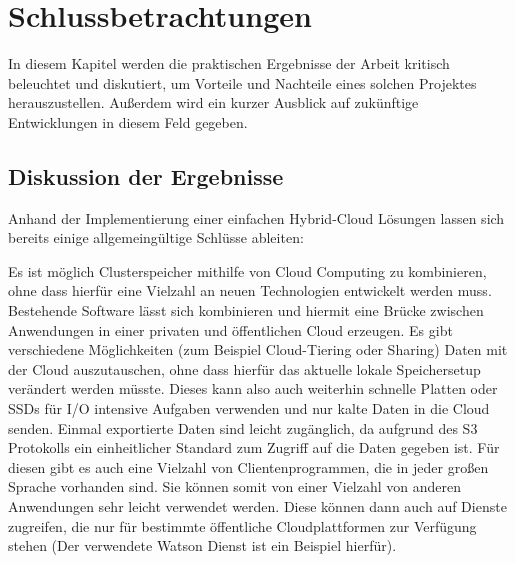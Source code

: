 \chapter{Schlussbetrachtungen}\label{ch:conclusion}

In diesem Kapitel werden die praktischen Ergebnisse der Arbeit kritisch beleuchtet und diskutiert, um Vorteile und Nachteile eines solchen Projektes herauszustellen. Außerdem wird ein kurzer Ausblick auf zukünftige Entwicklungen in diesem Feld gegeben.

\section{Diskussion der Ergebnisse}
Anhand der Implementierung einer einfachen Hybrid-Cloud Lösungen lassen sich bereits einige allgemeingültige Schlüsse ableiten:

Es ist möglich Clusterspeicher mithilfe von Cloud Computing zu kombinieren, ohne dass hierfür eine Vielzahl an neuen Technologien entwickelt werden muss. Bestehende Software lässt sich kombinieren und hiermit eine Brücke zwischen Anwendungen in einer privaten und öffentlichen Cloud erzeugen. Es gibt verschiedene Möglichkeiten (zum Beispiel Cloud-Tiering oder Sharing) Daten mit der Cloud auszutauschen, ohne dass hierfür das aktuelle lokale Speichersetup verändert werden müsste.
Dieses kann also auch weiterhin schnelle Platten oder \acp{SSD} für I/O intensive Aufgaben verwenden und nur kalte Daten in die Cloud senden.
Einmal exportierte Daten sind leicht zugänglich, da aufgrund des \ac{S3} Protokolls ein einheitlicher Standard zum Zugriff auf die Daten gegeben ist. Für diesen gibt es auch eine Vielzahl von Clientenprogrammen, die in jeder großen Sprache vorhanden sind.
Sie können somit von einer Vielzahl von anderen Anwendungen sehr leicht verwendet werden. Diese können dann auch auf Dienste zugreifen, die nur für bestimmte öffentliche Cloudplattformen zur Verfügung stehen (Der verwendete Watson Dienst ist ein Beispiel hierfür).

